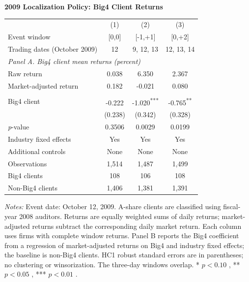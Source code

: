 \documentclass[10pt]{article}
\newcommand{\sym}[1]{\textsuperscript{#1}}
\begin{document}
\fontsize{10}{12}\selectfont\setlength{\parindent}{0pt}
\noindent\textbf{2009 Localization Policy: Big4 Client Returns}\par\medskip
\setlength{\tabcolsep}{3pt}\renewcommand{\arraystretch}{1.15}
\noindent\begin{tabular*}{\textwidth}{@{\extracolsep{\fill}}lccc@{}}
\toprule
 & (1) & (2) & (3) \\
Event window & [0,0] & [-1,+1] & [0,+2] \\
Trading dates (October 2009) & 12 & 9, 12, 13 & 12, 13, 14 \\
\midrule
\multicolumn{4}{l}{\textit{Panel A. Big4 client mean returns (percent)}} \\
Raw return & 0.038 & 6.350 & 2.367 \\
Market-adjusted return & 0.182 & -0.021 & 0.080 \\ \addlinespace
\multicolumn{4}{l}{\textit{Panel B. Big4 minus non-Big4 (percentage points)}} \\
Big4 client & -0.222\sym{} & -1.020\sym{***} & -0.765\sym{**} \\
 & (0.238) & (0.342) & (0.328) \\
\textit{p}-value & 0.3506 & 0.0029 & 0.0199 \\ \addlinespace
Industry fixed effects & Yes & Yes & Yes \\
Additional controls & None & None & None \\
Observations & 1,514 & 1,487 & 1,499 \\
Big4 clients & 108 & 106 & 108 \\
Non-Big4 clients & 1,406 & 1,381 & 1,391 \\
\bottomrule
\end{tabular*}
\par\medskip\fontsize{9}{11}\selectfont\textit{Notes:} Event date: October 12, 2009. A-share clients are classified using fiscal-year 2008 auditors. Returns are equally weighted sums of daily returns; market-adjusted returns subtract the corresponding daily market return. Each column uses firms with complete window returns. Panel B reports the Big4 coefficient from a regression of market-adjusted returns on Big4 and industry fixed effects; the baseline is non-Big4 clients. HC1 robust standard errors are in parentheses; no clustering or winsorization. The three-day windows overlap. * \ensuremath{p<0.10} , ** \ensuremath{p<0.05} , *** \ensuremath{p<0.01} .
\end{document}
